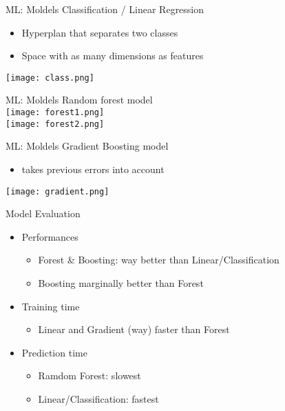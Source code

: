 \begin{frame}{ML: Moldels }
  Classification / Linear Regression
  \begin{itemize}
    \item Hyperplan that separates two classes
    \item Space with as many dimensions as features
  \end{itemize}
  \centering
\texttt{[image: class.png]}
\end{frame}

\begin{frame}{ML: Moldels }
  Random forest model\\
  \centering
\texttt{[image: forest1.png]}\\
\texttt{[image: forest2.png]}
\end{frame}

\begin{frame}{ML: Moldels }
  Gradient Boosting model
  \begin{itemize}
    \item takes previous errors into account
  \end{itemize}
\texttt{[image: gradient.png]}
\end{frame}

\begin{frame}{Model Evaluation}
  \begin{itemize}
    \item Performances
    \begin{itemize}
      \item Forest \& Boosting: way better than Linear/Classification
      \item Boosting marginally better than Forest
    \end{itemize}
    \item Training time
    \begin{itemize}
        \item Linear and Gradient (way) faster than Forest
    \end{itemize}
    \item Prediction time
    \begin{itemize}
        \item Ramdom Forest: slowest
        \item Linear/Classification: fastest
    \end{itemize}
  \end{itemize}
\end{frame}


